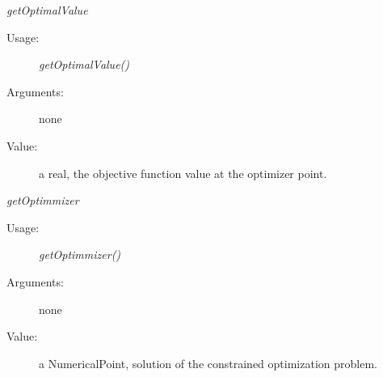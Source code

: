 \begin{description}
\begin{description}
  \item \textit{getOptimalValue}
    \begin{description}
    \item[Usage:] \textit{getOptimalValue()}
    \item[Arguments:] none
    \item[Value:] a real, the objective function value at the optimizer point.
    \end{description}
    \bigskip

  \item \textit{getOptimmizer}
    \begin{description}
    \item[Usage:] \textit{getOptimmizer()}
    \item[Arguments:] none
    \item[Value:] a NumericalPoint, solution of the constrained optimization problem.
    \end{description}


  \end{description}

\end{description}
